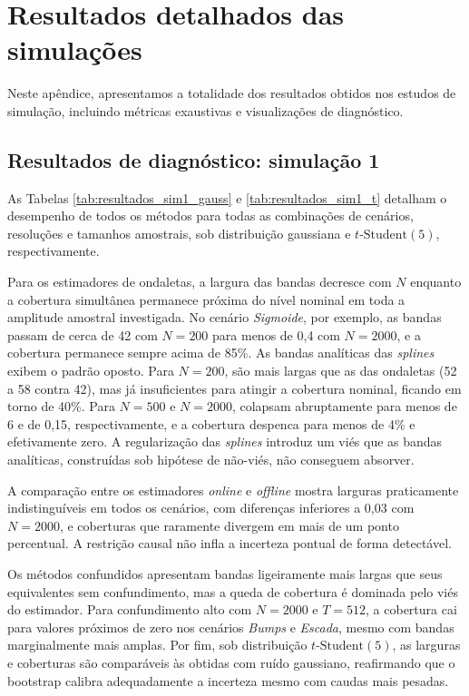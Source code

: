 \chapter{Resultados detalhados das simulações}
\label{ap-simulacoes-completas}

Neste apêndice, apresentamos a totalidade dos resultados obtidos nos estudos de simulação, incluindo métricas exaustivas e visualizações de diagnóstico.

\section{Resultados de diagnóstico: simulação 1}

As Tabelas \ref{tab:resultados_sim1_gauss} e \ref{tab:resultados_sim1_t} detalham o desempenho de todos os métodos para todas as combinações de cenários, resoluções e tamanhos amostrais, sob distribuição gaussiana e \(t\text{-Student}(5)\), respectivamente.

Para os estimadores de ondaletas, a largura das bandas decresce com \(N\) enquanto a cobertura simultânea permanece próxima do nível nominal em toda a amplitude amostral investigada.
No cenário \emph{Sigmoide}, por exemplo, as bandas passam de cerca de 42 com \(N = 200\) para menos de 0{,}4 com \(N = 2000\), e a cobertura permanece sempre acima de 85\%.
As bandas analíticas das \emph{splines} exibem o padrão oposto.
Para \(N = 200\), são mais largas que as das ondaletas (52 a 58 contra 42), mas já insuficientes para atingir a cobertura nominal, ficando em torno de 40\%.
Para \(N = 500\) e \(N = 2000\), colapsam abruptamente para menos de 6 e de 0{,}15, respectivamente, e a cobertura despenca para menos de 4\% e efetivamente zero.
A regularização das \emph{splines} introduz um viés que as bandas analíticas, construídas sob hipótese de não-viés, não conseguem absorver.

A comparação entre os estimadores \emph{online} e \emph{offline} mostra larguras praticamente indistinguíveis em todos os cenários, com diferenças inferiores a 0{,}03 com \(N = 2000\), e coberturas que raramente divergem em mais de um ponto percentual.
A restrição causal não infla a incerteza pontual de forma detectável.

Os métodos confundidos apresentam bandas ligeiramente mais largas que seus equivalentes sem confundimento, mas a queda de cobertura é dominada pelo viés do estimador.
Para confundimento alto com \(N = 2000\) e \(T = 512\), a cobertura cai para valores próximos de zero nos cenários \emph{Bumps} e \emph{Escada}, mesmo com bandas marginalmente mais amplas.
Por fim, sob distribuição \(t\text{-Student}(5)\), as larguras e coberturas são comparáveis às obtidas com ruído gaussiano, reafirmando que o bootstrap calibra adequadamente a incerteza mesmo com caudas mais pesadas.


